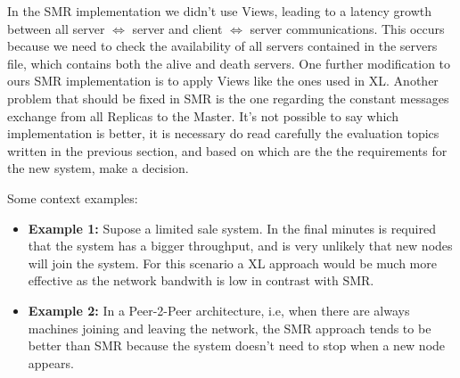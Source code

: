 \documentclass[times, 10pt,twocolumn]{article}
\begin{document}
In the SMR implementation we didn't use Views, leading to a latency growth between all server $\Leftrightarrow$ server and client $\Leftrightarrow$ server communications. 
This occurs because we need to check the availability of all servers contained in the servers file, which contains both the alive and death 
servers. One further modification to ours SMR implementation is to apply Views like the ones used in XL. 
Another problem that should be fixed in SMR is the one regarding the constant messages exchange from all Replicas to the Master.
It's not possible to say which implementation is better, it is necessary do read carefully the evaluation topics written in the previous section,
and based on which are the the requirements for the new system, make a decision.


Some context examples:
\begin{itemize}
   \item \textbf{Example 1:} Supose a limited sale system. In the final minutes
   is required that the system has a bigger throughput, and is very unlikely
   that new nodes will join the system. For this scenario a XL approach would
   be much more effective as the network bandwith is low in contrast with SMR.
   \item \textbf{Example 2:} In a Peer-2-Peer architecture, i.e, when there are always
   machines joining and leaving the network, the SMR approach tends to be better than
   SMR because the system doesn't need to stop when a new node appears.
\end{itemize}

\nocite{ex1,ex2}


\end{document}
